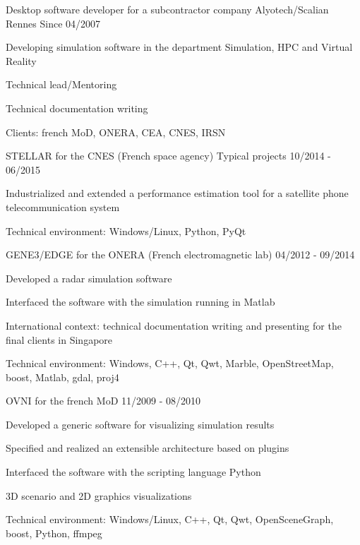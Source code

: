 \begin{cventries}
  \cventry
    {Desktop software developer for a subcontractor company}
    {Alyotech/Scalian}
    {Rennes}
    {Since 04/2007}
    {
      \begin{cvitems}
        \item {Developing simulation software in the department Simulation, HPC
            and Virtual Reality}
        \item {Technical lead/Mentoring}
        \item {Technical documentation writing}
        \item {Clients: french MoD, ONERA, CEA, CNES, IRSN}
      \end{cvitems}
    }

  \cventry
    {STELLAR for the CNES (French space agency)}
    {Typical projects}
    {}
    {10/2014 - 06/2015}
    {
      \begin{cvitems}
        \item {Industrialized and extended a performance estimation tool for a
            satellite phone telecommunication system}
        \item {Technical environment: Windows/Linux, Python, PyQt}
      \end{cvitems}
    }

  \cventry
    {GENE3/EDGE for the ONERA (French electromagnetic lab)}
    {}
    {}
    {04/2012 - 09/2014}
    {
      \begin{cvitems}
        \item {Developed a radar simulation software}
        \item {Interfaced the software with the simulation running in Matlab}
        \item {International context: technical documentation writing and
            presenting for the final clients in Singapore}
		\item {Technical environment: Windows, C++, Qt, Qwt, Marble, OpenStreetMap,
	  		   boost, Matlab, gdal, proj4}
      \end{cvitems}
    }

  \cventry
    {OVNI for the french MoD}
    {}
    {}
    {11/2009 - 08/2010}
    {
      \begin{cvitems}
        \item {Developed a generic software for visualizing simulation results}
        \item {Specified and realized an extensible architecture based on plugins}
        \item {Interfaced the software with the scripting language Python}
        \item {3D scenario and 2D graphics visualizations}
		\item {Technical environment: Windows/Linux, C++, Qt, Qwt, OpenSceneGraph,
			boost, Python, ffmpeg}
      \end{cvitems}
    }


\end{cventries}
